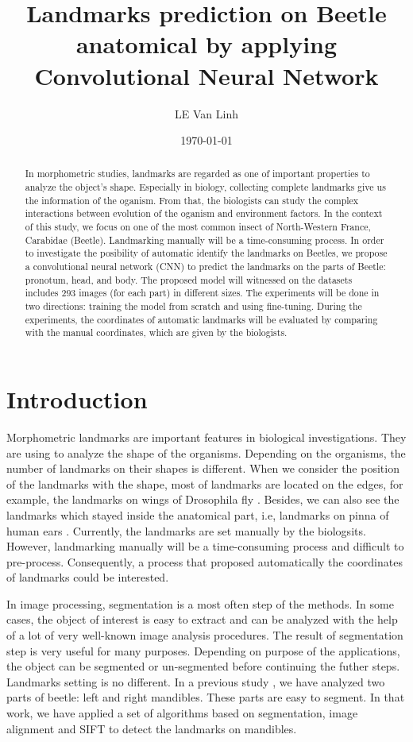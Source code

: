 \documentclass[12pt,a4paper]{article}
\begin{document}
\title{Landmarks prediction on Beetle anatomical by applying Convolutional Neural Network }
\author{LE Van Linh}
\date{\today}
\maketitle
\begin{abstract}
	In morphometric studies, landmarks are regarded as one of important properties to analyze the object's shape. Especially in biology, collecting complete landmarks give us the information of the oganism. From that, the biologists can study the complex interactions between evolution of the oganism and environment factors. In the context of this study, we focus on one of the most common insect of North-Western France, Carabidae (Beetle). Landmarking manually will be a time-consuming process. In order to investigate the posibility of automatic identify the landmarks on Beetles, we propose a convolutional neural network (CNN) to predict the landmarks on the parts of Beetle: pronotum, head, and body. The proposed model will witnessed on the datasets includes $293$ images (for each part) in different sizes. The experiments will be done in two directions: training the model from scratch and using fine-tuning. During the experiments, the coordinates of automatic landmarks will be evaluated by comparing with the manual coordinates, which are given by the biologists.
\end{abstract}
\section{Introduction}
Morphometric landmarks are important features in biological investigations. They are using to analyze the shape of the organisms. Depending on the organisms, the number of landmarks on their shapes is different. When we consider the position of the landmarks with the shape, most of landmarks are located on the edges, for example, the landmarks on wings of Drosophila fly \cite{.}. Besides, we can also see the landmarks which stayed inside the anatomical part, i.e, landmarks on pinna of human ears \cite{.}. Currently, the landmarks are set manually by the biologsits. However, landmarking manually will be a time-consuming process and difficult to pre-process. Consequently, a process that proposed automatically the coordinates of landmarks could be interested.

In image processing, segmentation is a most often step of the methods. In some cases, the object of interest is easy to extract and can be analyzed with the help of a lot of very well-known image analysis procedures. The result of segmentation step is very useful for many purposes. Depending on purpose of the applications, the object can be segmented or un-segmented before continuing the futher steps. Landmarks setting is no different. In a previous study \cite{.}, we have analyzed two parts of beetle: left and right mandibles. These parts are easy to segment. In that work, we have applied a set of algorithms based on segmentation, image alignment and SIFT \cite{.} to detect the landmarks on mandibles. 
\end{document}
